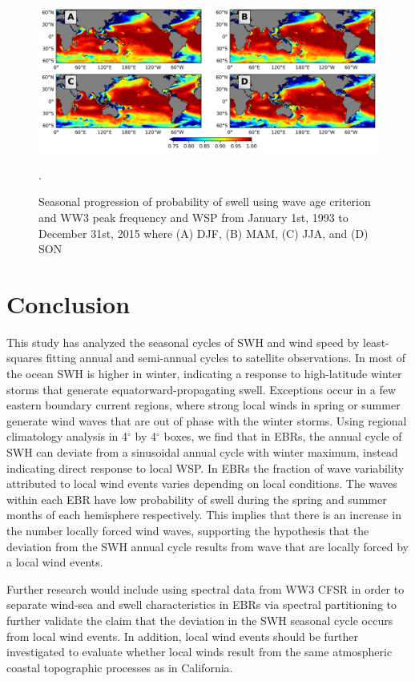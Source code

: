 \documentclass[draft,linenumbers]{agujournal2018}
\begin{document}
\begin{figure}[tbh]
\centering
\includegraphics[width=1.0\textwidth]{figs/probability_of_swell/WW3_CFSR_prob_swell_seasons_2x2.png}
\caption{Seasonal progression of probability of swell using wave age criterion and WW3 peak frequency and WSP from January 1st, 1993 to December 31st, 2015 where (A) DJF, (B) MAM, (C) JJA, and (D) SON}.
\label{prob_swell_ww3}
\end{figure}

\section{Conclusion}

This study has analyzed the seasonal cycles of SWH and wind speed by least-squares fitting annual and semi-annual cycles to satellite observations.  In most of the ocean SWH is higher in winter, indicating a response to high-latitude winter storms that generate equatorward-propagating swell.  Exceptions occur in a few eastern boundary current regions, where strong local winds in spring or summer generate wind waves that are out of phase with the winter storms.  Using regional climatology analysis in 4$^{\circ}$ by 4$^{\circ}$ boxes, we find that in EBRs, the annual cycle of SWH can deviate from a sinusoidal annual cycle with winter maximum, instead indicating direct response to local WSP.  In EBRs the fraction of wave variability attributed to local wind events varies depending on local conditions. The waves within each EBR have low probability of swell during the spring and summer months of each hemisphere respectively. This implies that there is an increase in the number locally forced wind waves, supporting the hypothesis that the deviation from the SWH annual cycle results from wave that are locally forced by a local wind events.

Further research would include using spectral data from WW3 CFSR in order to separate wind-sea and swell characteristics in EBRs via spectral partitioning to further validate the claim that the deviation in the SWH seasonal cycle occurs from local wind events. In addition, local wind events should be further investigated to evaluate whether local winds result from the same atmospheric coastal topographic processes as in California. 
\end{document}

